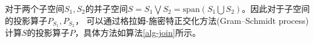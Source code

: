 对于两个子空间$S_1,S_2$的并子空间$S=S_1\bigvee S_2 = \text{span} \left( S_1 \bigcup S_2 \right)$。因此对于子空间的投影算子$P_{S_1},P_{S_2}$，
可以通过格拉姆-施密特正交化方法(Gram–Schmidt process)计算$S$的投影算子$P$，具体方法如算法\ref{alg-join}所示。

